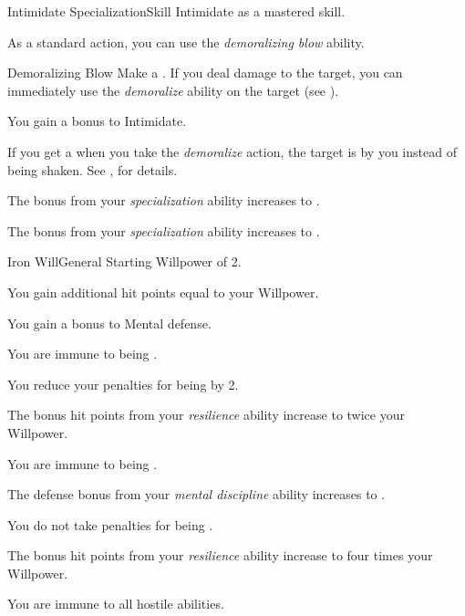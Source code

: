     \begin{feat}{Intimidate Specialization}{Skill}
        \featpre Intimidate as a mastered skill.

         As a standard action, you can use the \textit{demoralizing blow} ability.
        \begin{ability}{Demoralizing Blow}
            Make a .
            If you deal damage to the target, you can immediately use the \textit{demoralize} ability on the target (see ).
        \end{ability}

         You gain a  bonus to Intimidate.

         If you get a  when you take the \textit{demoralize} action, the target is \frightened by you instead of being shaken.
        See , for details.

         The bonus from your \textit{specialization} ability increases to .

         The bonus from your \textit{specialization} ability increases to .
    \end{feat}

    \begin{feat}{Iron Will}{General}
        \featpre Starting Willpower of 2.

         You gain additional hit points equal to your Willpower.

         You gain a  bonus to Mental defense.

         You are immune to being .

         You reduce your penalties for being  by 2.

         The bonus hit points from your \textit{resilience} ability increase to twice your Willpower.

         You are immune to being .

         The defense bonus from your \textit{mental discipline} ability increases to .

         You do not take penalties for being .

         The bonus hit points from your \textit{resilience} ability increase to four times your Willpower.

         You are immune to all hostile  abilities.
    \end{feat}

